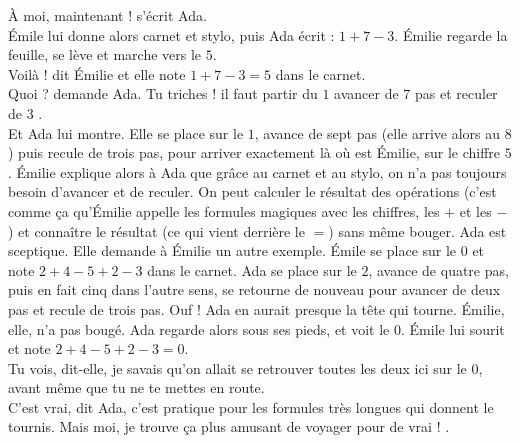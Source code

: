 \guillemotleft À moi, maintenant ! s’écrit Ada. \guillemotright \\
Émile lui donne alors carnet et stylo, puis Ada écrit : $1 + 7 - 3 $. Émilie regarde la feuille, se lève et marche vers le $5$.\\
\guillemotleft Voilà ! dit Émilie et elle note $1 + 7 - 3 = 5$ dans le carnet.\\
\mdash Quoi ? demande Ada. Tu triches ! il faut partir du $1$ avancer de $7$ pas et reculer de $3$ \guillemotright.\\
Et Ada lui montre. Elle se place sur le $1$, avance de sept pas (elle arrive alors au $8$) puis recule de trois pas, pour arriver exactement là où est Émilie, sur le chiffre $5$. Émilie explique alors à Ada que grâce au carnet et au stylo, on n’a pas toujours besoin d’avancer et de reculer. On peut calculer le résultat des opérations (c’est comme ça qu’Émilie appelle les formules magiques avec les chiffres, les $+$ et les $-$) et connaître le résultat (ce qui vient derrière le $=$) sans même bouger. Ada est sceptique. Elle demande à Émilie un autre exemple. Émile se place sur le $0$ et note $2 + 4 - 5 + 2 - 3$ dans le carnet. Ada se place sur le $2$, avance de quatre pas, puis en fait cinq dans l’autre sens, se retourne de nouveau pour avancer de deux pas et recule de trois pas. Ouf ! Ada en aurait presque la tête qui tourne. Émilie, elle, n’a pas bougé. Ada regarde alors sous ses pieds, et voit le $0$. Émile lui sourit et note $2 + 4 - 5 + 2 - 3 = 0$.\\
\guillemotleft Tu vois, dit-elle, je savais qu’on allait se retrouver toutes les deux ici sur le 0, avant même que tu ne te mettes en route.\\
\mdash C’est vrai, dit Ada, c’est pratique pour les formules très longues qui donnent le tournis. Mais moi, je trouve ça plus amusant de voyager pour de vrai ! \guillemotright.

%    
